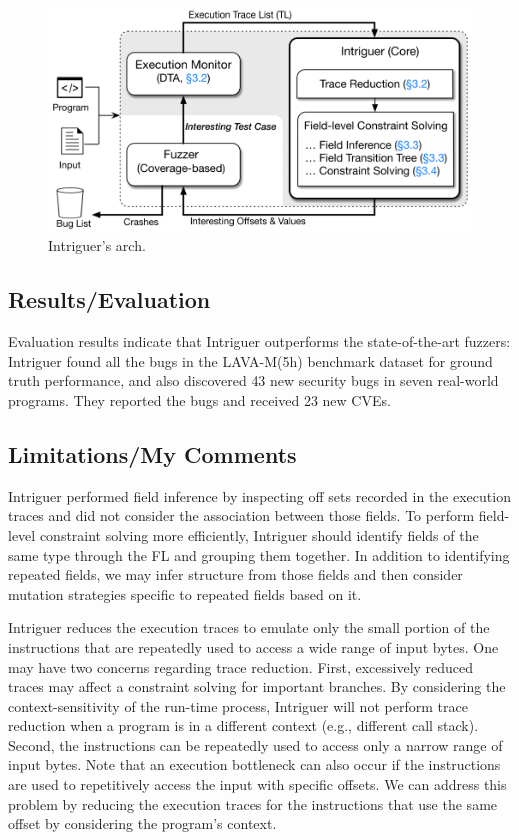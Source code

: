 \begin{figure}[h]
    \centering
    \includegraphics[width=\linewidth]{intriguer.png} %
    \caption{Intriguer's arch.}	
    \label{fig:intriguer}
\end{figure}
\subsection{Results/Evaluation}
Evaluation results indicate that Intriguer outperforms the state-of-the-art fuzzers: Intriguer found all the bugs in the LAVA-M(5h) benchmark dataset for ground truth performance, and also discovered 43 new security bugs in seven real-world programs. They reported the bugs and received 23 new CVEs.

\subsection{Limitations/My Comments}
 Intriguer performed field inference by inspecting off sets recorded in the execution traces and did not consider the association between those fields.  To perform field-level constraint solving more efficiently, Intriguer should identify fields of the same type through the FL and grouping them together. In addition to identifying repeated fields, we may infer structure from those fields and then consider mutation strategies specific to repeated fields based on it.

Intriguer reduces the execution traces to emulate only the small portion of the instructions that are repeatedly used to access a wide range of input bytes. One may have two concerns regarding trace reduction. First, excessively reduced traces may affect a constraint solving for important branches. By considering the context-sensitivity of the run-time process, Intriguer will not perform trace reduction when a program is in a different context (e.g., different call stack). Second, the instructions can be repeatedly used to access only a narrow range of input bytes. Note that an execution bottleneck can also occur if the instructions are used to repetitively access the input with specific offsets. We can address this problem by reducing the execution traces for the instructions that use the same offset by considering the program’s context.

